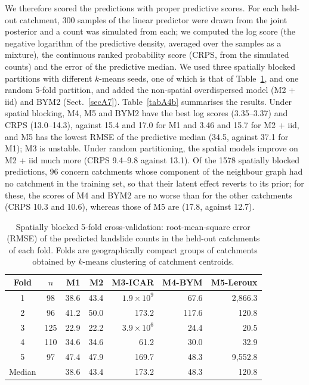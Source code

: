 \documentclass[journal abbreviation, manuscript]{copernicus}
\begin{document}
We therefore scored the predictions with proper predictive scores. For each held-out catchment, 300 samples of the linear predictor were drawn from the joint posterior and a count was simulated from each; we computed the log score (the negative logarithm of the predictive density, averaged over the samples as a mixture), the continuous ranked probability score (CRPS, from the simulated counts) and the error of the predictive median. We used three spatially blocked partitions with different $k$-means seeds, one of which is that of Table~\ref{tabA4}, and one random 5-fold partition, and added the non-spatial overdispersed model (M2 + iid) and BYM2 (Sect.~\ref{secA7}). Table~\ref{tabA4b} summarises the results. Under spatial blocking, M4, M5 and BYM2 have the best log scores (3.35--3.37) and CRPS (13.0--14.3), against 15.4 and 17.0 for M1 and 3.46 and 15.7 for M2 + iid, and M5 has the lowest RMSE of the predictive median (34.5, against 37.1 for M1); M3 is unstable. Under random partitioning, the spatial models improve on M2 + iid much more (CRPS 9.4--9.8 against 13.1). Of the 1578 spatially blocked predictions, 96 concern catchments whose component of the neighbour graph had no catchment in the training set, so that their latent effect reverts to its prior; for these, the scores of M4 and BYM2 are no worse than for the other catchments (CRPS 10.3 and 10.6), whereas those of M5 are (17.8, against 12.7).


\begin{table}[h]
\caption{Spatially blocked 5-fold cross-validation: root-mean-square error (RMSE) of the predicted landslide counts in the held-out catchments of each fold. Folds are geographically compact groups of catchments obtained by $k$-means clustering of catchment centroids.}\label{tabA4}
\footnotesize
\begin{tabular}{@{}ccrrrrr@{}}
\toprule
Fold & $n$ & M1 & M2 & M3-ICAR & M4-BYM & M5-Leroux \\
\midrule
1 & 98 & 38.6 & 43.4 & $1.9 \times 10^{9}$ & 67.6 & 2,866.3 \\
2 & 96 & 41.2 & 50.0 & 173.2 & 117.6 & 120.8 \\
3 & 125 & 22.9 & 22.2 & $3.9 \times 10^{6}$ & 24.4 & 20.5 \\
4 & 110 & 34.6 & 34.6 & 61.2 & 30.0 & 32.9 \\
5 & 97 & 47.4 & 47.9 & 169.7 & 48.3 & 9,552.8 \\
\midrule
Median & & 38.6 & 43.4 & 173.2 & 48.3 & 120.8 \\
\bottomrule
\end{tabular}
\end{table}
\end{document}
